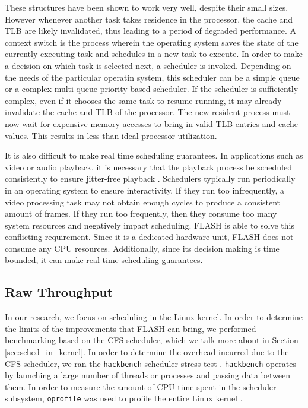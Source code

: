 \documentclass{sig-alternate-10pt}
\begin{document}
These structures have been shown to work very well, despite their small sizes. However whenever another task takes residence in the processor, the cache and TLB are likely invalidated, thus leading to a period of degraded performance. A context switch is the process wherein the operating system saves the state of the currently executing task and schedules in a new task to execute. In order to make a decision on which task is selected next, a scheduler is invoked. Depending on the needs of the particular operatin system, this scheduler can be a simple queue or a complex multi-queue priority based scheduler. If the scheduler is sufficiently complex, even if it chooses the same task to resume running, it may already invalidate the cache and TLB of the processor. The new resident process must now wait for expensive memory accesses to bring in valid TLB entries and cache values. This results in less than ideal processor utilization.

It is also difficult to make real time scheduling guarantees. In applications such as video or audio playback, it is necessary that the playback process be scheduled consistently to ensure jitter-free playback \cite{groves2009bfs}. Schedulers typically run periodically in an operating system to ensure interactivity. If they run too infrequently, a video processing task may not obtain enough cycles to produce a consistent amount of frames. If they run too frequently, then they consume too many system resources and negatively impact scheduling. FLASH is able to solve this conflicting requirement. Since it is a dedicated hardware unit, FLASH does not consume any CPU resources. Additionally, since its decision making is time bounded, it can make real-time scheduling guarantees.

\subsection{Raw Throughput}
In our research, we focus on scheduling in the Linux kernel. In order to determine the limits of the improvements that FLASH can bring, we performed benchmarking based on the CFS scheduler, which we talk more about in Section \ref{sec:sched_in_kernel}. In order to determine the overhead incurred due to the CFS scheduler, we ran the \verb|hackbench| scheduler stress test \cite{hackbench}. \verb|hackbench| operates by launching a large number of threads or processes and passing data between them. In order to measure the amount of CPU time spent in the scheduler subsystem, \verb|oprofile| was used to profile the entire Linux kernel \cite{oprofile}.
\end{document}
